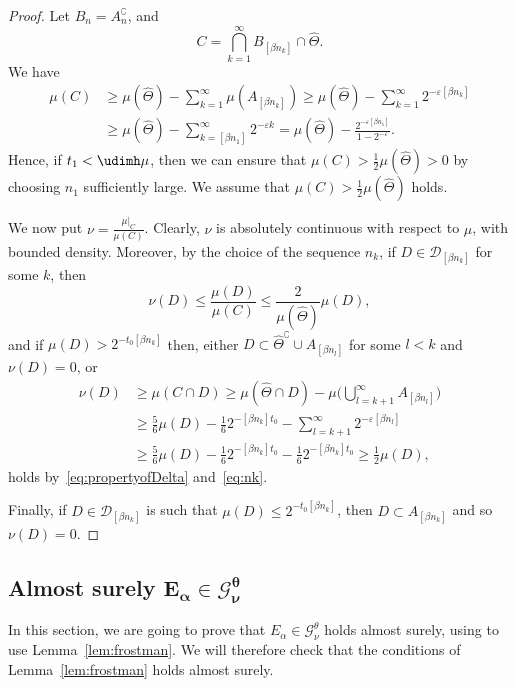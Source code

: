 \begin{proof}
Let $B_n = A_n^\complement$, and
\[
C = \bigcap_{k=1}^\infty B_{[\beta n_k]} \cap \hat{\Theta}.
\]
We have
\begin{align*}
\mu (C) &\geq \mu (\hat{\Theta}) - \sum_{k=1}^\infty \mu (A_{[\beta n_k]}) \geq \mu (\hat{\Theta}) - \sum_{k=1}^\infty 2^{-
\varepsilon [\beta n_k]} \\ &\geq \mu (\hat{\Theta}) -
\sum_{k=[\beta n_1]}^\infty 2^{-\varepsilon k} = \mu (\hat{\Theta}) - \frac{2^{-\varepsilon [\beta n_1]}}{1 - 2^{-\varepsilon}}.
\end{align*}
Hence, if $t_1 < \udimh \mu$, then we can ensure that $\mu (C) >
\frac{1}{2} \mu (\hat{\Theta}) > 0$ by choosing $n_1$ sufficiently large. We assume that $\mu (C) > \frac{1}{2} \mu (\hat{\Theta})$ holds.

We now put $\nu = \frac{\mu|_C}{\mu (C)}$. Clearly, $\nu$ is absolutely continuous with respect to $\mu$, with bounded density. Moreover, by the choice of the sequence $n_k$, if $D \in
\mathscr{D}_{[\beta n_k]}$ for some $k$, then
\[
\nu (D) \leq \frac{\mu (D)}{\mu (C)} \leq \frac{2}{\mu(\hat{\Theta})}
\mu (D),
\]
and if $\mu (D) > 2^{- t_0 [\beta n_k]}$ then, either $D \subset
\hat{\Theta}^\complement \cup A_{[\beta n_l]}$ for some $l < k$ and $\nu (D) = 0$, or
\begin{align*}
\nu (D) &\geq \mu (C \cap D) \geq \mu (\hat{\Theta} \cap D) - \mu
\biggl(\bigcup_{l = k+1}^\infty A_{[\beta n_l]} \biggr) \\ &\geq
\frac{5}{6} \mu (D) - \frac{1}{6} 2^{-[\beta n_k]t_0} -
\sum_{l=k+1}^\infty 2^{-\varepsilon [\beta n_l]} \\ &\geq
\frac{5}{6} \mu (D) - \frac{1}{6} 2^{-[\beta n_k]t_0} -
\frac{1}{6} 2^{-[\beta n_k] t_0} \geq \frac{1}{2} \mu (D),
\end{align*}
holds by~\eqref{eq:propertyofDelta} and~\eqref{eq:nk}.

Finally, if $D \in \mathscr{D}_{[\beta n_k]}$ is such that $\mu (D)
\leq 2^{- t_0 [\beta n_k]}$, then $D \subset A_{[\beta n_k]}$ and so $\nu (D) = 0$.
\end{proof}

\subsection{Almost surely \texorpdfstring{$\boldsymbol{E_\alpha \in \mathscr{G}_\nu^\theta}$}{}}

In this section, we are going to prove that $E_\alpha \in
\mathscr{G}_\nu^\theta$ holds almost surely, using to use Lemma~\ref{lem:frostman}. We will therefore check that the conditions of Lemma~\ref{lem:frostman} holds almost surely.

